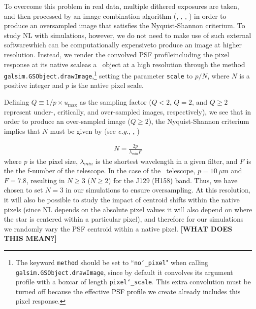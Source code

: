 \documentclass[11pt,preprint,flushrt]{aastex}
\begin{document}
To overcome this problem in real data, multiple dithered exposures are taken, and then processed by an image combination algorithm (\citealt{lauer99b}, \citealt{fruchter02}, \citealt{bertin06}, \citealt{rowe11}) in order to produce an oversampled image that satisfies the Nyquist-Shannon criterium. To study NL with simulations, however, we do not need to make use of such external software\textemdash which can be computationally expensive\textemdash to produce an image at higher resolution.  Instead, we render the convolved PSF profile\textemdash including the pixel response at its native scale\textemdash as a \gs\ object at a high resolution through the method {\tt{galsim.GSObject.drawImage}},\footnote{The keyword {\tt{method}} should be set to ``{\tt{no\char`_pixel}}" when calling {\tt{galsim.GSObject.drawImage}}, since by default it convolves its argument profile with a boxcar of length {\tt{pixel\char`_scale}}. This extra convolution must be turned off because the effective PSF profile we create already includes this pixel response.} setting the parameter {\tt{scale}} to $p/N$, where $N$ is a positive integer and $p$ is the native pixel scale. 
 
Defining $Q\equiv1/p\times u_{\text{max}}$ as the sampling factor ($Q<2$, $Q=2$, and $Q\geq2$ represent under-, critically, and over-sampled images, respectively), we see that in order to produce an over-sampled image ($Q\geq2$), the Nyquist-Shannon criterium implies that $N$ must be given by (see \emph{e.g.}, \citealt{marks09}, \citealt{shapiro13})

\begin{align}
N=\frac{2p}{\lambda_{min} F}
\label{nimages}
\end{align}
where $p$ is the pixel size, $\lambda_{min}$ is the shortest wavelength in a given filter, and $F$ is the the f-number of the telescope. In the case of the \wfa\ telescope, $p=10\ \mu$m and $F=7.8$, resulting in $N\geq3$ ($N\geq2$) for the J129 (H158) band. Thus, we have chosen to set $N=3$ in our simulations
to ensure oversampling.
At this resolution, it will also be possible to study the impact of centroid shifts within the native pixels (since NL depends on the absolute pixel values it will also depend on where the star is centered within a particular pixel), and therefore for our simulations we randomly vary the PSF centroid within a native pixel. \textbf{[WHAT DOES THIS MEAN?]}
\end{document}
